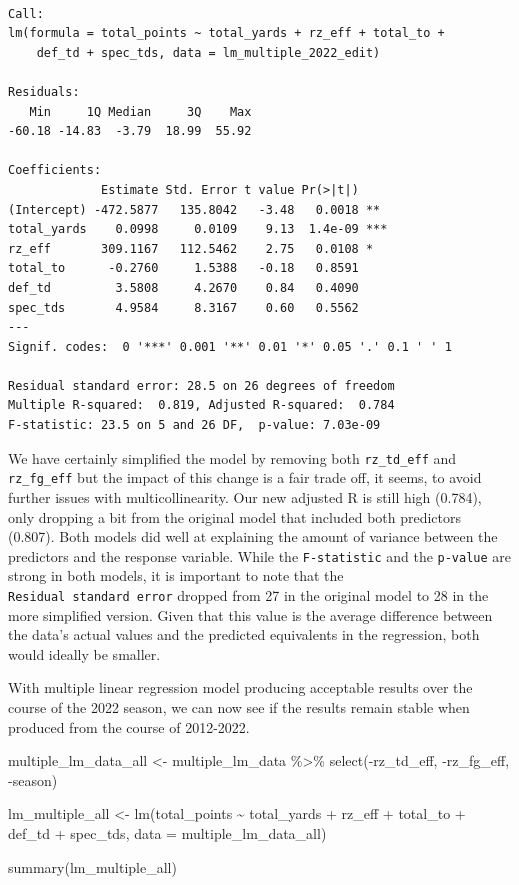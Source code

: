 \documentclass[
  letterpaper,
]{krantz}
\newenvironment{Shaded}{\begin{snugshade}}{\end{snugshade}}
\newcommand{\AttributeTok}[1]{\textcolor[rgb]{0.40,0.45,0.13}{#1}}
\newcommand{\FunctionTok}[1]{\textcolor[rgb]{0.28,0.35,0.67}{#1}}
\newcommand{\NormalTok}[1]{\textcolor[rgb]{0.00,0.23,0.31}{#1}}
\newcommand{\OtherTok}[1]{\textcolor[rgb]{0.00,0.23,0.31}{#1}}
\newcommand{\SpecialCharTok}[1]{\textcolor[rgb]{0.37,0.37,0.37}{#1}}
\begin{document}
\begin{verbatim}

Call:
lm(formula = total_points ~ total_yards + rz_eff + total_to + 
    def_td + spec_tds, data = lm_multiple_2022_edit)

Residuals:
   Min     1Q Median     3Q    Max 
-60.18 -14.83  -3.79  18.99  55.92 

Coefficients:
             Estimate Std. Error t value Pr(>|t|)    
(Intercept) -472.5877   135.8042   -3.48   0.0018 ** 
total_yards    0.0998     0.0109    9.13  1.4e-09 ***
rz_eff       309.1167   112.5462    2.75   0.0108 *  
total_to      -0.2760     1.5388   -0.18   0.8591    
def_td         3.5808     4.2670    0.84   0.4090    
spec_tds       4.9584     8.3167    0.60   0.5562    
---
Signif. codes:  0 '***' 0.001 '**' 0.01 '*' 0.05 '.' 0.1 ' ' 1

Residual standard error: 28.5 on 26 degrees of freedom
Multiple R-squared:  0.819, Adjusted R-squared:  0.784 
F-statistic: 23.5 on 5 and 26 DF,  p-value: 7.03e-09
\end{verbatim}

We have certainly simplified the model by removing both
\texttt{rz\_td\_eff} and \texttt{rz\_fg\_eff} but the impact of this
change is a fair trade off, it seems, to avoid further issues with
multicollinearity. Our new adjusted R is still high (0.784), only
dropping a bit from the original model that included both predictors
(0.807). Both models did well at explaining the amount of variance
between the predictors and the response variable. While the
\texttt{F-statistic} and the \texttt{p-value} are strong in both models,
it is important to note that the \texttt{Residual\ standard\ error}
dropped from 27 in the original model to 28 in the more simplified
version. Given that this value is the average difference between the
data's actual values and the predicted equivalents in the regression,
both would ideally be smaller.

With multiple linear regression model producing acceptable results over
the course of the 2022 season, we can now see if the results remain
stable when produced from the course of 2012-2022.

\begin{Shaded}
\begin{Highlighting}[]
\NormalTok{multiple\_lm\_data\_all }\OtherTok{\textless{}{-}}\NormalTok{ multiple\_lm\_data }\SpecialCharTok{\%\textgreater{}\%}
  \FunctionTok{select}\NormalTok{(}\SpecialCharTok{{-}}\NormalTok{rz\_td\_eff, }\SpecialCharTok{{-}}\NormalTok{rz\_fg\_eff, }\SpecialCharTok{{-}}\NormalTok{season)}

\NormalTok{lm\_multiple\_all }\OtherTok{\textless{}{-}} \FunctionTok{lm}\NormalTok{(total\_points }\SpecialCharTok{\textasciitilde{}}\NormalTok{ total\_yards }\SpecialCharTok{+}\NormalTok{ rz\_eff }\SpecialCharTok{+}
\NormalTok{                              total\_to }\SpecialCharTok{+}\NormalTok{ def\_td }\SpecialCharTok{+}\NormalTok{ spec\_tds,}
                      \AttributeTok{data =}\NormalTok{ multiple\_lm\_data\_all)}

\FunctionTok{summary}\NormalTok{(lm\_multiple\_all)}
\end{Highlighting}
\end{Shaded}
\end{document}
